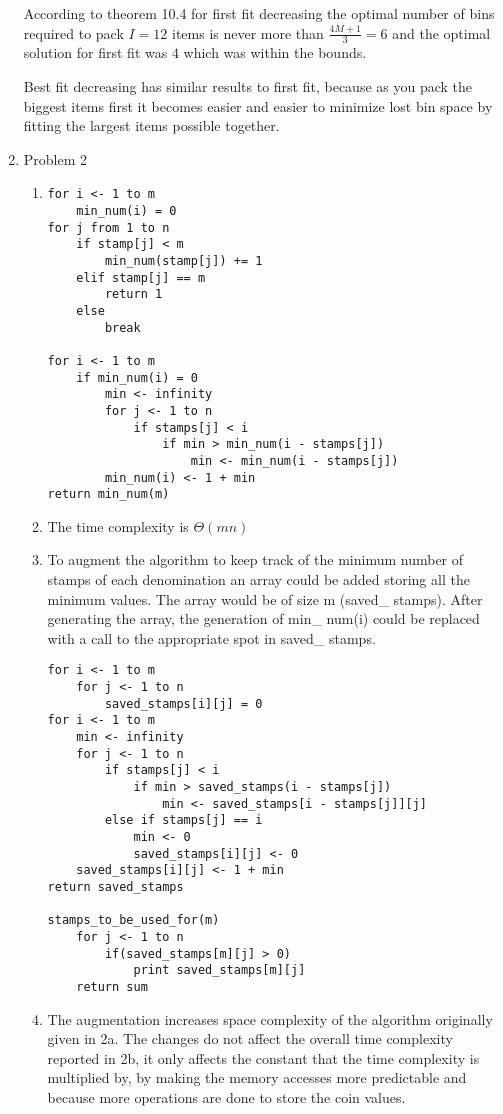 \documentclass[11pt]{article}
\begin{document}
\begin{enumerate}
According to theorem 10.4 for first fit decreasing the optimal number of bins required to pack $I = 12$ items is never more than  $\frac{4M + 1}{3} = 6$ and the optimal solution for first fit was $4$ which was within the bounds.

Best fit decreasing has similar results to first fit, because as you pack the biggest items first it becomes easier and easier to minimize lost bin space by fitting the largest items possible together.

\item Problem 2

\begin{enumerate}
 \item \begin{Verbatim}
for i <- 1 to m
	min_num(i) = 0
for j from 1 to n
	if stamp[j] < m
		min_num(stamp[j]) += 1
	elif stamp[j] == m
		return 1
	else
		break

for i <- 1 to m
	if min_num(i) = 0
		min <- infinity
		for j <- 1 to n
			if stamps[j] < i
				if min > min_num(i - stamps[j])
					min <- min_num(i - stamps[j])
		min_num(i) <- 1 + min
return min_num(m)
\end{Verbatim}
\item The time complexity is $\Theta (mn)$

\item To augment the algorithm to keep track of the minimum number of stamps of each denomination an array could be added storing all the minimum values. The array would be of size m (saved\_ stamps). After generating the array, the generation of min\_ num(i) could be replaced with a call to the appropriate spot in saved\_ stamps.\\
\begin{Verbatim}
for i <- 1 to m
	for j <- 1 to n
		saved_stamps[i][j] = 0
for i <- 1 to m
	min <- infinity
	for j <- 1 to n
		if stamps[j] < i
			if min > saved_stamps(i - stamps[j])
				min <- saved_stamps[i - stamps[j]][j]
		else if stamps[j] == i
			min <- 0
			saved_stamps[i][j] <- 0
	saved_stamps[i][j] <- 1 + min
return saved_stamps

stamps_to_be_used_for(m)	
	for j <- 1 to n
		if(saved_stamps[m][j] > 0)
			print saved_stamps[m][j]
	return sum
\end{Verbatim}
\item The augmentation increases space complexity of the algorithm originally given in 2a. The changes do not affect the overall time complexity reported in 2b, it only affects the constant that the time complexity is multiplied by, by making the memory accesses more predictable and because more operations are done to store the coin values.


\end{enumerate}
\end{enumerate}
\end{document}
